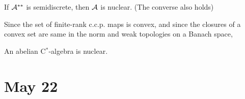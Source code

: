 \documentclass{../../small}
\begin{document}
\begin{thm}
If $\mathcal{A}^{**}$ is semidiscrete, then $\mathcal{A}$ is nuclear.
(The converse also holds)
\end{thm}
\begin{pf}
Since the set of finite-rank c.c.p. maps is convex, and since the closures of a convex set are same in the norm and weak topologies on a Banach space, 
\end{pf}

\begin{thm}
An abelian C$^*$-algebra is nuclear.
\end{thm}



\newpage
\section{May 22}
\end{document}
